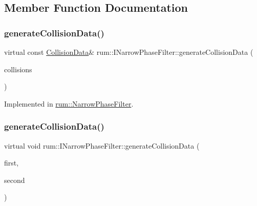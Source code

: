 \subsection{Member Function Documentation}
\mbox{\label{classrum_1_1_i_narrow_phase_filter_acfce7d2c3d62880920b1ca415f891526}} 
\subsubsection{\texorpdfstring{generate\+Collision\+Data()}{generateCollisionData()}\hspace{0.1cm}{\footnotesize\ttfamily [1/5]}}
{\footnotesize\ttfamily virtual const \mbox{\hyperlink{classrum_1_1_collision_data}{Collision\+Data}}\& rum\+::\+I\+Narrow\+Phase\+Filter\+::generate\+Collision\+Data (\begin{DoxyParamCaption}\item[{const std\+::vector$<$ \mbox{\hyperlink{structrum_1_1_broad_phase_collision}{Broad\+Phase\+Collision}} $>$ \&}]{collisions }\end{DoxyParamCaption})\hspace{0.3cm}{\ttfamily [pure virtual]}}



Implemented in \mbox{\hyperlink{classrum_1_1_narrow_phase_filter_a3c31b3e4ec6b2c1a1c104ac734be686c}{rum\+::\+Narrow\+Phase\+Filter}}.

\mbox{\label{classrum_1_1_i_narrow_phase_filter_ade1c61b0bd136086ff27ca34953508c1}} 
\subsubsection{\texorpdfstring{generate\+Collision\+Data()}{generateCollisionData()}\hspace{0.1cm}{\footnotesize\ttfamily [2/5]}}
{\footnotesize\ttfamily virtual void rum\+::\+I\+Narrow\+Phase\+Filter\+::generate\+Collision\+Data (\begin{DoxyParamCaption}\item[{\mbox{\hyperlink{classrum_1_1_collision_box}{Collision\+Box}} $\ast$}]{first,  }\item[{\mbox{\hyperlink{classrum_1_1_collision_box}{Collision\+Box}} $\ast$}]{second }\end{DoxyParamCaption})\hspace{0.3cm}{\ttfamily [pure virtual]}}



